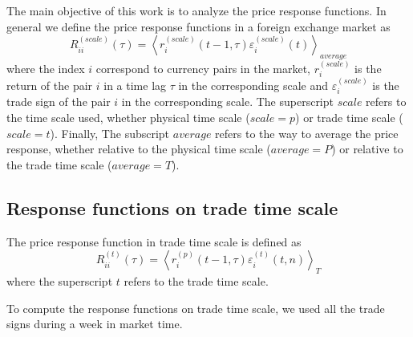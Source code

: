 The main objective of this work is to analyze the price response functions. In
general we define the price response functions in a foreign exchange market as
\begin{equation}\label{eq:response_general}
    R^{\left(scale\right)}_{ii}\left(\tau\right)=\left\langle
    r^{\left(scale\right)}_{i}\left(t-1, \tau\right)
    \varepsilon^{\left(scale\right)}_{i} \left(t\right)\right\rangle_{average}
\end{equation}
where the index $i$ correspond to currency pairs in the market,
$r^{\left(scale\right)}_{i}$ is the return of the pair $i$ in a time lag $\tau$
in the corresponding scale and $\varepsilon^{\left(scale\right)}_{i}$ is the
trade sign of the pair $i$ in the corresponding scale. The superscript $scale$
refers to the time scale used, whether physical time scale
($scale = p$) or trade time scale ($scale = t$). Finally, The subscript
$average$ refers to the way to average the price response, whether relative to
the physical time scale ($average = P$) or relative to the trade time scale
($average = T$).

\subsection{Response functions on trade time scale}
\label{subsec:response_function_trade}

The price response function in trade time scale is defined as
\begin{equation}\label{eq:response_functions_trade_scale_general}
    R^{\left(t\right)}_{ii}\left(\tau\right)=\left\langle r^{\left(p\right)}
    _{i}\left(t-1,\tau \right)\varepsilon_{i}^{\left(t\right)}
    \left(t, n\right)\right\rangle _{T}
\end{equation}
where the superscript $t$ refers to the trade time scale.

To compute the response functions on trade time scale, we used all the trade
signs during a week in market time.


